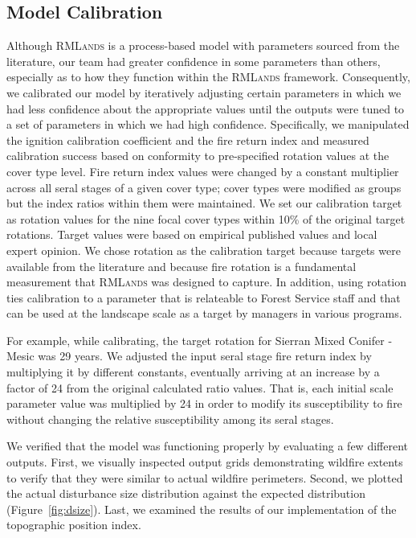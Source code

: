 \subsection{Model Calibration}
Although \textsc{RMLands} is a process-based model with parameters sourced from the literature, our team had greater confidence in some parameters than others, especially as to how they function within the \textsc{RMLands} framework. Consequently, we calibrated our model by iteratively adjusting certain parameters in which we had less confidence about the appropriate values until the outputs were tuned to a set of parameters in which we had high confidence. Specifically, we manipulated the ignition calibration coefficient and the fire return index and measured calibration success based on conformity to pre-specified rotation values at the cover type level. Fire return index values were changed by a constant multiplier across all seral stages of a given cover type; cover types were modified as groups but the index ratios within them were maintained. We set our calibration target as rotation values for the nine focal cover types within 10\% of the original target rotations. Target values were based on empirical published values and local expert opinion. We chose rotation as the calibration target because targets were available from the literature and because fire rotation is a fundamental measurement that \textsc{RMLands} was designed to capture. In addition, using rotation ties calibration to a parameter that is relateable to Forest Service staff and that can be used at the landscape scale as a target by managers in various programs.

For example, while calibrating, the target rotation for Sierran Mixed Conifer - Mesic was 29 years. We adjusted the input seral stage fire return index by multiplying it by different constants, eventually arriving at an increase by a factor of 24 from the original calculated ratio values. That is, each initial scale parameter value was multiplied by 24 in order to modify its susceptibility to fire without changing the relative susceptibility among its seral stages. 

We verified that the model was functioning properly by evaluating a few different outputs. First, we visually inspected output grids demonstrating wildfire extents to verify that they were similar to actual wildfire perimeters. Second, we plotted the actual disturbance size distribution against the expected distribution (Figure~\ref{fig:dsize}). Last, we examined the results of our implementation of the topographic position index.

